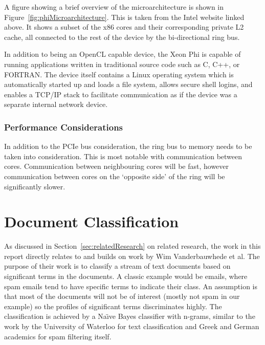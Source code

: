 A figure showing a brief overview of the microarchitecture is shown in
Figure~\ref{fig:phiMicroarchitecture}. This is taken from the Intel website
linked above. It shows a subset of the x86 cores and their corresponding private
L2 cache, all connected to the rest of the device by the bi-directional ring
bus.

In addition to being an OpenCL capable device, the Xeon Phi is capable of
running applications written in traditional source code such as C, C++, or
FORTRAN. The device itself contains a Linux operating system which is
automatically started up and loads a file system, allows secure shell logins,
and enables a TCP/IP stack to facilitate communication as if the device was a
separate internal network device.

\subsubsection{Performance Considerations}

In addition to the PCIe bus consideration, the ring bus to memory needs to be
taken into consideration. This is most notable with communication between cores.
Communication between neighbouring cores will be fast, however communication
between cores on the `opposite side' of the ring will be significantly slower.

\section{Document Classification}

As discussed in Section~\ref{sec:relatedResearch} on related research, the work
in this report directly relates to and builds on work by Wim Vanderbauwhede et
al. The purpose of their work is to classify a stream of text documents based on
significant terms in the documents. A classic example would be emails, where
spam emails tend to have specific terms to indicate their class. An assumption
is that most of the documents will not be of interest (mostly not spam in our
example) so the profiles of significant terms discriminates highly. The
classification is achieved by a Na{\"{\i}}ve Bayes classifier with n-grams,
similar to the work by the University of Waterloo \cite{peng2003combining} for
text classification and Greek \cite{metsis2006spam} and German
\cite{Schneider:2003:CEM:1067807.1067848} academics for spam filtering itself.

